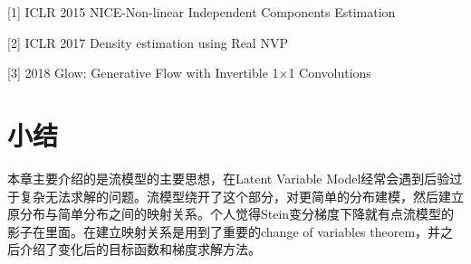 \documentclass[a4paper]{article}
\begin{document}
[1] ICLR 2015 NICE-Non-linear Independent Components Estimation

[2] ICLR 2017 Density estimation using Real NVP

[3] 2018 Glow: Generative Flow with Invertible 1×1 Convolutions

\section{小结}
本章主要介绍的是流模型的主要思想，在Latent Variable Model经常会遇到后验过于复杂无法求解的问题。流模型绕开了这个部分，对更简单的分布建模，然后建立原分布与简单分布之间的映射关系。个人觉得Stein变分梯度下降就有点流模型的影子在里面。在建立映射关系是用到了重要的change of variables theorem，并之后介绍了变化后的目标函数和梯度求解方法。
\end{document}

